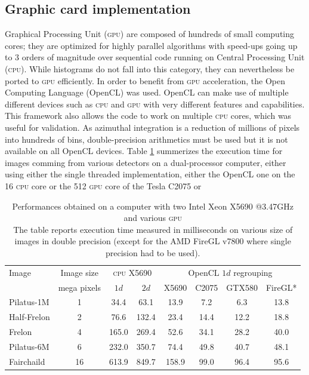 \documentclass[a4paper]{jpconf}
\begin{document}
\subsection{Graphic card implementation}
Graphical Processing Unit (\textsc{gpu}) are composed of hundreds of
small computing cores; they are optimized for highly parallel algorithms
with speed-ups going up to 3 orders of magnitude over sequential code running
on Central Processing Unit (\textsc{cpu}).
While histograms do not fall into this category, they can  nevertheless be
ported to \textsc{gpu} efficiently. In order to benefit from \textsc{gpu} acceleration,
the Open Computing Language\cite{opencl} (OpenCL) was used. OpenCL can make use
of multiple different devices such as \textsc{cpu} and \textsc{gpu} with very 
different features and capabilities.
This framework also allows the code to work on multiple \textsc{cpu} cores, which was
useful for validation. As azimuthal integration is a reduction
of millions of pixels into hundreds of bins, double-precision arithmetics must
be used but it is not available on all OpenCL devices.
Table \ref{perfs} summerizes the execution time for images comming from various
detectors on a dual-processor computer, either using either the single threaded
implementation, either the OpenCL one on the 16 \textsc{cpu} core or the 512
\textsc{gpu} core of the Tesla C2075 or 

\begin{table}[h]
\begin{center}
\caption{\label{perfs}Performances obtained on a computer with two Intel
Xeon X5690 @3.47GHz and various \textsc{gpu}\\
 The table reports execution time measured in milliseconds on various size of
 images in double precision (except for the AMD FireGL v7800 where single
 precision had to be used).}

\begin{tabular}{|l|c||c|c||c|c|c|c|}
\hline
Image               & Image size 	& \multicolumn{2}{|c||}{\textsc{cpu} X5690}& \multicolumn{4}{|c|}{OpenCL $1d$ regrouping} \\
					& mega pixels	& $1d$	&	$2d$	&	X5690	&	C2075	&	GTX580	&	FireGL* \\
\hline
Pilatus-1M 			& 1  			& 34.4  &	63.1	&	13.9	&	7.2		&	6.3		&	13.8 \\
Half-Frelon 		& 2  			& 76.6  &   132.4   &	23.4	&	14.4	&	12.2	&	18.8 \\
Frelon 				& 4  			& 165.0	&	269.4   &	52.6	&	34.1	&	28.2	&	40.0 \\
Pilatus-6M 			& 6  			& 232.0	&	350.7	&	74.4	&	49.8	&	40.7	&	48.1 \\
Fairchaild 			& 16 			& 613.9	&	849.7   &	158.9	&	99.0	&	96.4	&	95.6 \\
\hline
\end{tabular}
\end{center}
\end{table}
\end{document}
